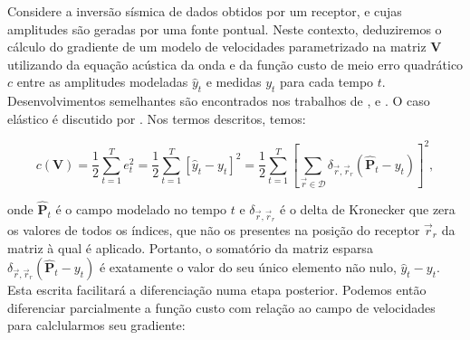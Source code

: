 %                                                                
%                                                                
%                                                                  

 \label{a:equivalencia_fwi_rnn}

  Considere a inversão sísmica de dados obtidos por um receptor, e cujas amplitudes são geradas por uma fonte pontual. Neste contexto, deduziremos o cálculo do gradiente de um modelo de velocidades parametrizado na matriz $\boldsymbol{V}$ utilizando da equação acústica da onda e da função custo de meio erro quadrático $c$ entre as amplitudes modeladas $\hat{y}_t$ e medidas $y_t$ para cada tempo $t$. Desenvolvimentos semelhantes são encontrados nos trabalhos de ,  e . O caso elástico é discutido por . Nos termos descritos, temos:

  \begin{equation} \label{e:custo_rnn}
    c(\boldsymbol{V}) =
    \frac{1}{2} \sum \limits_{t=1}^T e_t^2 =
    \frac{1}{2} \sum \limits_{t=1}^T [\hat{y}_t - y_t]^2 =
    \frac{1}{2} \sum \limits_{t=1}^T
      \left[
        \sum \limits_{\vec{r} \in \mathcal{D}} \delta_{\vec{r}, \vec{r}_r}
        (\boldsymbol{\hat{P}}_t - y_t)
      \right]^2
    ,
  \end{equation}

  \noindent onde $\boldsymbol{\hat{P}}_t$ é o campo modelado no tempo $t$ e $\delta_{\vec{r}, \vec{r}_r}$ é o delta de Kronecker que zera os valores de todos os índices, que não os presentes na posição do receptor $\vec{r}_r$ da matriz à qual é aplicado. Portanto, o somatório da matriz esparsa $\delta_{\vec{r}, \vec{r}_r}(\boldsymbol{\hat{P}}_t - y_t)$ é exatamente o valor do seu único elemento não nulo, $\hat{y}_t - y_t$. Esta escrita facilitará a diferenciação numa etapa posterior. Podemos então diferenciar parcialmente a função custo com relação ao campo de velocidades para calclularmos seu gradiente:

